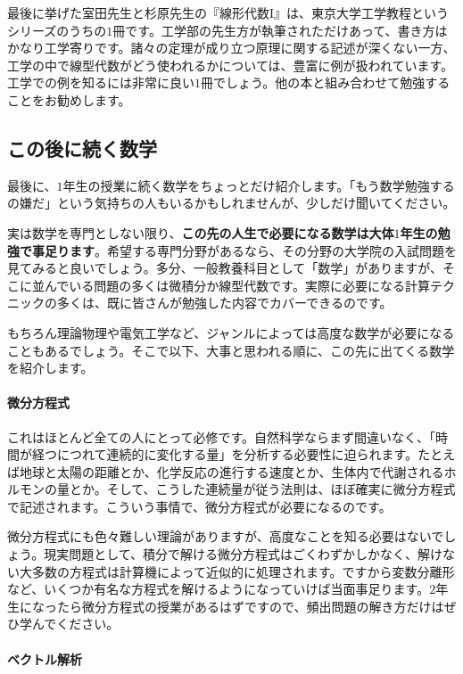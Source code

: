 最後に挙げた室田先生と杉原先生の『線形代数I』は、東京大学工学教程というシリーズのうちの$1$冊です。工学部の先生方が執筆されただけあって、書き方はかなり工学寄りです。諸々の定理が成り立つ原理に関する記述が深くない一方、工学の中で線型代数がどう使われるかについては、豊富に例が扱われています。工学での例を知るには非常に良い$1$冊でしょう。他の本と組み合わせて勉強することをお勧めします。

\subsection{この後に続く数学}

最後に、$1$年生の授業に続く数学をちょっとだけ紹介します。「もう数学勉強するの嫌だ」という気持ちの人もいるかもしれませんが、少しだけ聞いてください。

実は数学を専門としない限り、\textbf{この先の人生で必要になる数学は大体$1$年生の勉強で事足ります}。希望する専門分野があるなら、その分野の大学院の入試問題を見てみると良いでしょう。多分、一般教養科目として「数学」がありますが、そこに並んでいる問題の多くは微積分か線型代数です。実際に必要になる計算テクニックの多くは、既に皆さんが勉強した内容でカバーできるのです。

もちろん理論物理や電気工学など、ジャンルによっては高度な数学が必要になることもあるでしょう。そこで以下、大事と思われる順に、この先に出てくる数学を紹介します。

\paragraph{微分方程式}

これはほとんど全ての人にとって必修です。自然科学ならまず間違いなく、「時間が経つにつれて連続的に変化する量」を分析する必要性に迫られます。たとえば地球と太陽の距離とか、化学反応の進行する速度とか、生体内で代謝されるホルモンの量とか。そして、こうした連続量が従う法則は、ほぼ確実に微分方程式で記述されます。こういう事情で、微分方程式が必要になるのです。

微分方程式にも色々難しい理論がありますが、高度なことを知る必要はないでしょう。現実問題として、積分で解ける微分方程式はごくわずかしかなく、解けない大多数の方程式は計算機によって近似的に処理されます。ですから変数分離形など、いくつか有名な方程式を解けるようになっていけば当面事足ります。$2$年生になったら微分方程式の授業があるはずですので、頻出問題の解き方だけはぜひ学んでください。

\paragraph{ベクトル解析}

